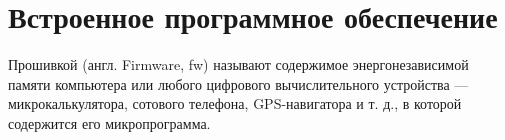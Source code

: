\section{Встроенное программное обеспечение}
Прошивкой (англ. Firmware, fw) называют содержимое энергонезависимой памяти компьютера или любого цифрового вычислительного устройства — микрокалькулятора, сотового телефона, GPS-навигатора и т. д., в которой содержится его микропрограмма. \cite{wiki}



